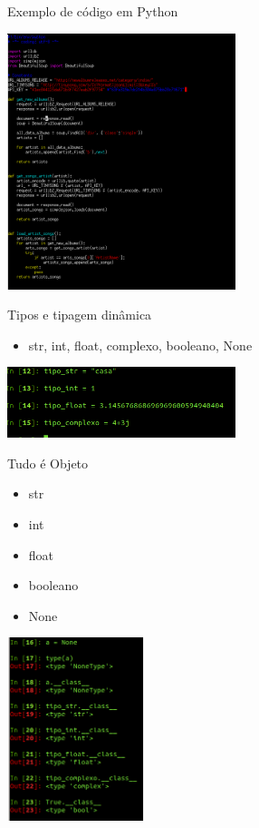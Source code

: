 \documentclass{beamer}
\begin{document}
\begin{frame}{Exemplo de c\'odigo em Python}
 \begin{center}
   \includegraphics[width=0.5\textwidth]{images/code_py.png}
\end{center}
\end{frame}

\begin{frame}{Tipos e tipagem din\^amica}
 \begin{itemize}
  \item str, int, float, complexo, booleano, None
 \end{itemize}
 
 \begin{center}
   \includegraphics[width=0.5\textwidth]{images/tipos_py.png}
\end{center}

\end{frame}

\begin{frame}{Tudo \'e Objeto}
 \begin{itemize}
  \item str
  \item int
  \item float
  \item booleano
  \item None
 \end{itemize}

 \begin{center}
   \includegraphics[width=0.3\textwidth]{images/quasetudo_objeto.png}
\end{center}
\end{frame}
\end{document}
